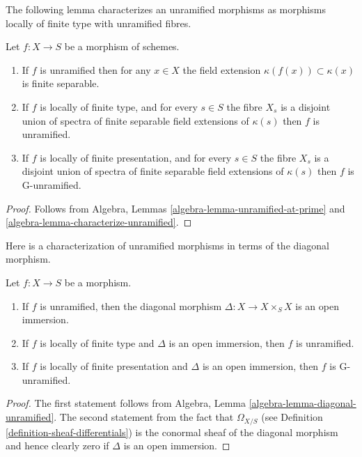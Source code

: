 \noindent
The following lemma characterizes an unramified morphisms as
morphisms locally of finite type with unramified fibres.

\begin{lemma}
\label{lemma-unramfied-etale-fibres}
Let $f : X \to S$ be a morphism of schemes.
\begin{enumerate}
\item If $f$ is unramified then for any $x \in X$ the field extension
$\kappa(f(x)) \subset \kappa(x)$ is finite separable.
\item If $f$ is locally of finite type, and for every
$s \in S$ the fibre $X_s$ is a disjoint union of spectra of finite separable
field extensions of $\kappa(s)$ then $f$ is unramified.
\item If $f$ is locally of finite presentation, and for every
$s \in S$ the fibre $X_s$ is a disjoint union of spectra of finite separable
field extensions of $\kappa(s)$ then $f$ is G-unramified.
\end{enumerate}
\end{lemma}

\begin{proof}
Follows from Algebra, Lemmas
\ref{algebra-lemma-unramified-at-prime} and
\ref{algebra-lemma-characterize-unramified}.
\end{proof}

\noindent
Here is a characterization of unramified morphisms in terms of the
diagonal morphism.

\begin{lemma}
\label{lemma-diagonal-unramfied-morphism}
Let $f : X \to S$ be a morphism.
\begin{enumerate}
\item If $f$ is unramified, then the diagonal morphism
$\Delta : X \to X \times_S X$ is an open immersion.
\item If $f$ is locally of finite type
and $\Delta$ is an open immersion, then $f$ is unramified.
\item If $f$ is locally of finite presentation and $\Delta$ is an open
immersion, then $f$ is G-unramified.
\end{enumerate}
\end{lemma}

\begin{proof}
The first statement follows from
Algebra, Lemma \ref{algebra-lemma-diagonal-unramified}.
The second statement from the fact that $\Omega_{X/S}$
(see Definition \ref{definition-sheaf-differentials})
is the conormal sheaf of the diagonal morphism and hence
clearly zero if $\Delta$ is an open immersion.
\end{proof}

